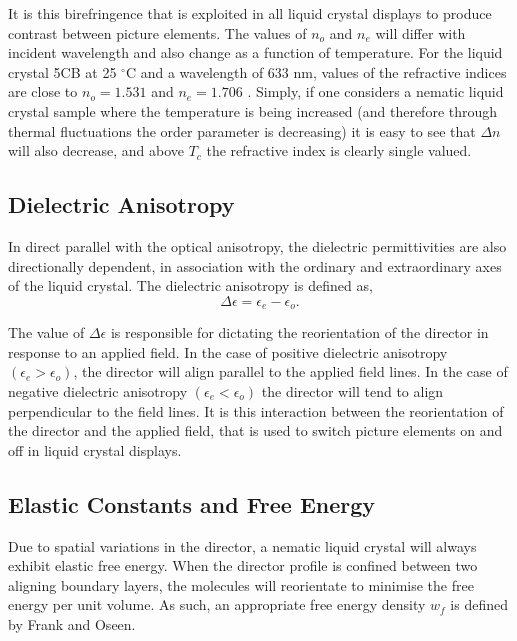 It is this birefringence that is exploited in all liquid crystal displays to produce contrast between picture elements. The values of $n_o$ and $n_e$ will differ with incident wavelength and also change as a function of temperature. For the liquid crystal 5CB at 25 $^{\circ}$C and a wavelength of 633 nm, values of the refractive indices are close to $n_o=1.531$ and $n_e=1.706$ \cite{Li2005}. Simply, if one considers a nematic liquid crystal sample where the temperature is being increased (and therefore through thermal fluctuations the order parameter is decreasing) it is easy to see that $\Delta n$ will also decrease, and above $T_c$ the refractive index is clearly single valued.  

\subsection{Dielectric Anisotropy}
In direct parallel with the optical anisotropy, the dielectric permittivities are also directionally dependent, in association with the ordinary and extraordinary axes of the liquid crystal. The dielectric anisotropy is defined as,
\begin{equation}
\Delta\epsilon=\epsilon_{e}-\epsilon_{o}.
\end{equation}

The value of $\Delta\epsilon$ is responsible for dictating the reorientation of the director in response to an applied field. In the case of positive dielectric anisotropy ${\left(\epsilon_{e}>\epsilon_{o}\right)}$, the director will align parallel to the applied field lines. In the case of negative dielectric anisotropy ${\left(\epsilon_{e}<\epsilon_{o}\right)}$ the director will tend to align perpendicular to the field lines. It is this interaction between the reorientation of the director and the applied field, that is used to switch picture elements on and off in liquid crystal displays.

\subsection{Elastic Constants and Free Energy}
\label{sec:Elastics}
Due to spatial variations in the director, a nematic liquid crystal will always exhibit elastic free energy. When the director profile is confined between two aligning boundary layers, the molecules will reorientate to minimise the free energy per unit volume. As such, an appropriate free energy density $w_f$ is defined by Frank and Oseen.


